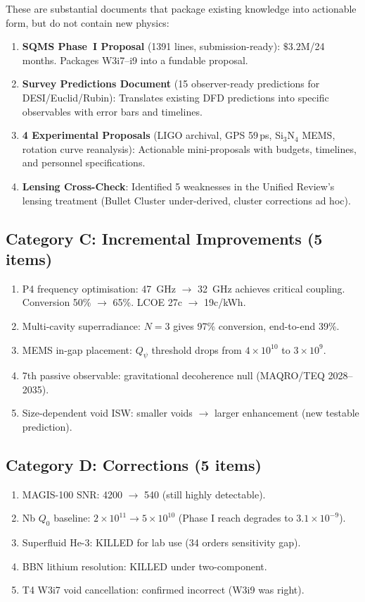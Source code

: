 \documentclass[11pt]{article}
\newcommand{\ee}[1]{\times 10^{#1}}
\begin{document}
These are substantial documents that package existing knowledge into
actionable form, but do not contain new physics:

\begin{enumerate}
\item \textbf{SQMS Phase~I Proposal} (1391 lines, submission-ready):
  $\$3.2$M/24 months. Packages W3i7--i9 into a fundable proposal.
\item \textbf{Survey Predictions Document} (15 observer-ready predictions
  for DESI/Euclid/Rubin): Translates existing DFD predictions into specific
  observables with error bars and timelines.
\item \textbf{4 Experimental Proposals} (LIGO archival, GPS 59\,ps,
  Si$_3$N$_4$ MEMS, rotation curve reanalysis): Actionable mini-proposals
  with budgets, timelines, and personnel specifications.
\item \textbf{Lensing Cross-Check}: Identified 5 weaknesses in the
  Unified Review's lensing treatment (Bullet Cluster under-derived,
  cluster corrections ad hoc).
\end{enumerate}

\subsection{Category C: Incremental Improvements (5 items)}

\begin{enumerate}
\item P4 frequency optimisation: 47~GHz $\to$ 32~GHz achieves critical
  coupling. Conversion 50\% $\to$ 65\%. LCOE 27c $\to$ 19c/kWh.
\item Multi-cavity superradiance: $N=3$ gives 97\% conversion, end-to-end 39\%.
\item MEMS in-gap placement: $Q_\psi$ threshold drops from $4\ee{10}$ to $3\ee{9}$.
\item 7th passive observable: gravitational decoherence null (MAQRO/TEQ 2028--2035).
\item Size-dependent void ISW: smaller voids $\to$ larger enhancement (new testable prediction).
\end{enumerate}

\subsection{Category D: Corrections (5 items)}

\begin{enumerate}
\item MAGIS-100 SNR: 4200 $\to$ 540 (still highly detectable).
\item Nb $Q_0$ baseline: $2\ee{11} \to 5\ee{10}$ (Phase I reach degrades to $3.1\ee{-9}$).
\item Superfluid He-3: KILLED for lab use (34 orders sensitivity gap).
\item BBN lithium resolution: KILLED under two-component.
\item T4 W3i7 void cancellation: confirmed incorrect (W3i9 was right).
\end{enumerate}
\end{document}
